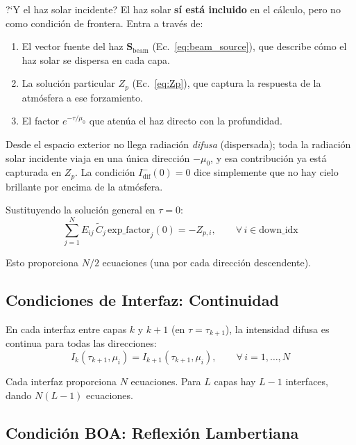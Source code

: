 \documentclass[a4paper,11pt]{article}
\begin{document}
\begin{physics}{?`Y el haz solar incidente?}
El haz solar \textbf{s\'i est\'a incluido} en el c\'alculo, pero no como condici\'on de frontera.  Entra a trav\'es de:
\begin{enumerate}
\item El vector fuente del haz $\mathbf{S}_{\text{beam}}$ (Ec.~\ref{eq:beam_source}), que describe c\'omo el haz solar se dispersa en cada capa.
\item La soluci\'on particular $Z_p$ (Ec.~\ref{eq:Zp}), que captura la respuesta de la atm\'osfera a ese forzamiento.
\item El factor $e^{-\tau/\mu_0}$ que aten\'ua el haz directo con la profundidad.
\end{enumerate}
Desde el espacio exterior no llega radiaci\'on \textit{difusa} (dispersada); toda la radiaci\'on solar incidente viaja en una \'unica direcci\'on $-\mu_0$, y esa contribuci\'on ya est\'a capturada en $Z_p$.  La condici\'on $I_{\text{dif}}^{-}(0) = 0$ dice simplemente que no hay cielo brillante por encima de la atm\'osfera.
\end{physics}

Sustituyendo la soluci\'on general en $\tau = 0$:
\begin{equation}
\sum_{j=1}^{N} E_{ij} \, \widetilde{C}_j \, \text{exp\_factor}_j(0) = -Z_{p,i}, \qquad \forall \, i \in \text{down\_idx}
\end{equation}

Esto proporciona $N/2$ ecuaciones (una por cada direcci\'on descendente).

\subsection{Condiciones de Interfaz: Continuidad}

En cada interfaz entre capas $k$ y $k+1$ (en $\tau = \tau_{k+1}$), la intensidad difusa es continua para todas las direcciones:
\begin{equation}
I_k(\tau_{k+1}, \mu_i) = I_{k+1}(\tau_{k+1}, \mu_i), \qquad \forall \, i = 1, \ldots, N
\label{eq:bc_interface}
\end{equation}

Cada interfaz proporciona $N$ ecuaciones. Para $L$ capas hay $L-1$ interfaces, dando $N(L-1)$ ecuaciones.

\subsection{Condici\'on BOA: Reflexi\'on Lambertiana}
\end{document}
